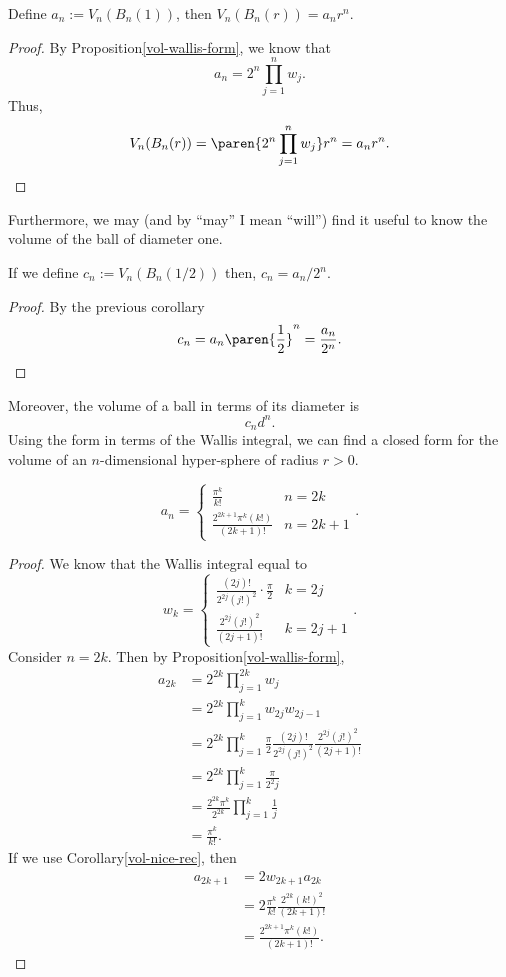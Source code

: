 \begin{corollary}
	Define $a_n:=V_n(B_n(1))$, then $V_n(B_n(r))=a_nr^n$.
\end{corollary}
\begin{proof}
	By Proposition\autoref{vol-wallis-form}, we know that
	\[
		a_n = 2^n \prod_{j=1}^n w_j.
	\]
	Thus,
	\[
		V_n(B_n(r)) = \paren{2^n \prod_{j=1}^n w_j} r^n =a_n r^n.
	\]
\end{proof}
Furthermore, we may (and by ``may'' I mean ``will'') find it useful to know the volume of the ball of diameter one.
\begin{corollary}
	If we define $c_n := V_n(B_n(1/2))$ then, $c_n = a_n/2^n$.
\end{corollary}
\begin{proof}
	By the previous corollary
	\[
		c_n = a_n \paren{\frac{1}{2}}^n=\frac{a_n}{2^n}.
	\]
\end{proof}
Moreover, the volume of a ball in terms of its diameter is
\[
	c_n d^n.
\]
Using the form in terms of the Wallis integral, we can find a closed form for the volume of an $n$-dimensional hyper-sphere of radius $r>0$.
\begin{thm}
	\[
		a_n =
		\begin{cases}
			\frac{\pi^k}{k!} & n=2k\\
			\frac{2^{2k+1}\pi^k (k!)}{(2k+1)!} & n=2k+1
		\end{cases}.
	\]
\end{thm}
\begin{proof}
	We know that the Wallis integral equal to
	\[
		w_k =
		\begin{cases}
			\frac{(2j)!}{2^{2j}(j!)^2}\cdot \frac{\pi}{2} & k=2j\\
			\frac{2^{2j}(j!)^2}{(2j+1)!} & k=2j+1
		\end{cases}.
	\]
	Consider $n = 2k$.
	Then by Proposition\autoref{vol-wallis-form},
	\begin{align*}
		a_{2k}&=2^{2k} \prod_{j=1}^{2k} w_j\\
		&=2^{2k} \prod_{j=1}^{k} w_{2j}w_{2j-1}\\
		&=2^{2k} \prod_{j=1}^{k} \frac{\pi}{2}\frac{(2j)!}{2^{2j}(j!)^2}\frac{2^{2j}(j!)^2}{(2j+1)!}\\
		&=2^{2k} \prod_{j=1}^{k}\frac{\pi}{2^2 j}\\
		&=\frac{2^{2k} \pi^k}{2^{2k}}\prod_{j=1}^k\frac{1}{j}\\
		&=\frac{\pi^k}{k!}.
	\end{align*}
	If we use Corollary\autoref{vol-nice-rec}, then
	\begin{align*}
		a_{2k+1}&=2w_{2k+1}a_{2k}\\
		&=2\frac{\pi^k}{k!}\frac{2^{2k}(k!)^2}{(2k+1)!}\\
		&=\frac{2^{2k+1}\pi^k(k!)}{(2k+1)!}.
	\end{align*}
\end{proof}

